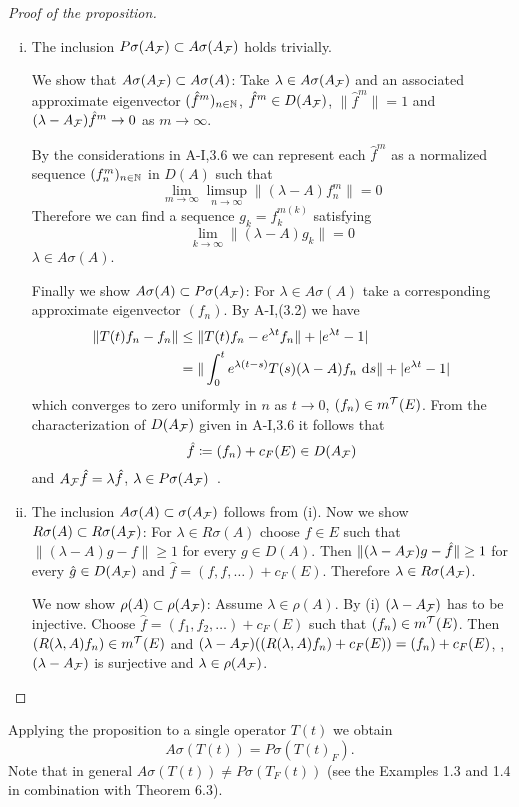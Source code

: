 \begin{proof}[Proof of the proposition]
\begin{enumerate}[(i), wide]
\item 
The inclusion $P\sigma(A_{\mathcal{F}}) \subset A\sigma(A_{\mathcal{F}})$ holds trivially.

We show that $A\sigma(A_{\mathcal{F}}) \subset A\sigma(A)$: Take $\lambda \in A\sigma(A_{\mathcal{F}})$ and an associated approximate eigenvector $({\hat{f}^{m}})_{n \in \mathbb{N}}$, \ie $\hat{f}^{m} \in D(A_{\mathcal{F}})$, $\|\hat{f}^{m}\| = 1$ and $(\lambda-A_{\mathcal{F}})\hat{f}^{m} \to 0$ as $m \to \infty$.

By the considerations in A-I,3.6 we can represent each $\hat{f}^{m}$ as a normalized sequence $(f_{n}^{m})_{n \in \mathbb{N}}$ in $D(A)$ such that
\[
\lim_{m \to \infty} \limsup_{n \to \infty} \|(\lambda-A)f_{n}^{m}\| = 0
\]
Therefore we can find a sequence $g_{k} = f_{k}^{m(k)}$ satisfying
\[
\lim_{k \to \infty} \|(\lambda-A)g_{k}\| = 0
\]
\ie $\lambda \in A\sigma(A)$.

Finally we show $A\sigma(A) \subset P\sigma(A_{\mathcal{F}})$: For $\lambda \in A\sigma(A)$ take a corresponding approximate eigenvector $(f_{n})$.
By A-I,(3.2) we have
\begin{align*}
\|T(t)f_{n} - f_{n}\| &\leq \|T(t)f_{n} - e^{\lambda t}f_{n}\| + |e^{\lambda t} - 1| \\
&= \|\int_{0}^{t} e^{\lambda(t-s)}T(s)(\lambda-A)f_{n} \, \mathop{}\!\mathrm{d}{s}\| + |e^{\lambda t} -1|
\end{align*}
which converges to zero uniformly in $n$ as $t \to 0$, \ie $(f_{n}) \in m^{\mathcal{T}}(E)$.
From the characterization of $D(A_{\mathcal{F}})$ given in A-I,3.6 it follows that
\[
\hat{f} \coloneqq (f_{n}) + c_{F}(E) \in D(A_{\mathcal{F}})
\]
and $A_{\mathcal{F}}\hat{f} = \lambda\hat{f}$, \ie $\lambda \in P\sigma(A_{\mathcal{F}})$~.

\item 
The inclusion $A\sigma(A) \subset \sigma(A_{\mathcal{F}})$ follows from (i). Now we show $R\sigma(A) \subset R\sigma(A_{\mathcal{F}})$:
For $\lambda \in R\sigma(A)$ choose $f \in E$ such that $\|(\lambda-A)g - f\| \geq 1$ for every $g \in D(A)$.
Then $\|(\lambda-A_{\mathcal{F}})g - \hat{f}\| \geq 1$ for every $\hat{g} \in D(A_{\mathcal{F}})$ and $\hat{f} = (f,f,\ldots) + c_{F}(E)$.
Therefore $\lambda \in R\sigma(A_{\mathcal{F}})$.

We now show $\rho(A) \subset \rho(A_{\mathcal{F}})$: Assume $\lambda \in \rho(A)$.
By (i) $(\lambda-A_{\mathcal{F}})$ has to be injective.
Choose $\hat{f} = (f_{1},f_{2},\ldots) + c_{F}(E)$ such that $(f_{n}) \in m^{\mathcal{T}}(E)$.
Then $(R(\lambda,A)f_{n}) \in m^{\mathcal{T}}(E)$ and $(\lambda-A_{\mathcal{F}})((R(\lambda,A)f_{n})+c_{F}(E)) = (f_{n}) + c_{F}(E)$, \ie, $(\lambda-A_{\mathcal{F}})$ is surjective and $\lambda \in \rho(A_{\mathcal{F}})$.
\end{enumerate}
\end{proof}
Applying the proposition to a single operator $T(t)$ we obtain
\[
A\sigma(T(t)) = P\sigma(T(t)_{F}) .
\]
Note that in general $A\sigma(T(t)) \neq P\sigma(T_{F}(t))$ (see the Examples 1.3 and 1.4 in combination with Theorem 6.3).
